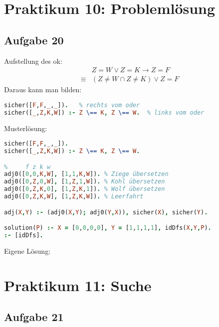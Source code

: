 \documentclass{scrreprt}
\begin{document}
\chapter{Praktikum 10: Problemlösung}
\section{Aufgabe 20}
Aufstellung des ok:
\begin{align*}
&Z=W \vee Z=K \to Z=F\\
\equiv& (Z \not = W \cap Z \not = K) \vee Z=F
\end{align*}
Daraus kann man bilden:
\begin{lstlisting}[language=Prolog]
sicher([F,F,_,_]).	 % rechts vom oder
sicher([_,Z,K,W]) :- Z \== K, Z \== W.	% links vom oder
\end{lstlisting}
Musterlösung:
\begin{lstlisting}[language=Prolog]
%				f z k w
sicher([F,F,_,_]).
sicher([_,Z,K,W]) :- Z \== K, Z \== W.

%     f z k w
adj0([0,0,K,W], [1,1,K,W]).	% Ziege übersetzen
adj0([0,Z,0,W], [1,Z,1,W]).	% Kohl übersetzen
adj0([0,Z,K,0], [1,Z,K,1]).	% Wolf übersetzen
adj0([0,Z,K,W], [1,Z,K,W]).	% Leerfahrt

adj(X,Y) :- (adj0(X,Y); adj0(Y,X)), sicher(X), sicher(Y).

solution(P) :- X = [0,0,0,0], Y = [1,1,1,1], idDfs(X,Y,P).
:- [idDfs].
\end{lstlisting}
Eigene Lösung:


\chapter{Praktikum 11: Suche}
\section{Aufgabe 21}

\end{document}
